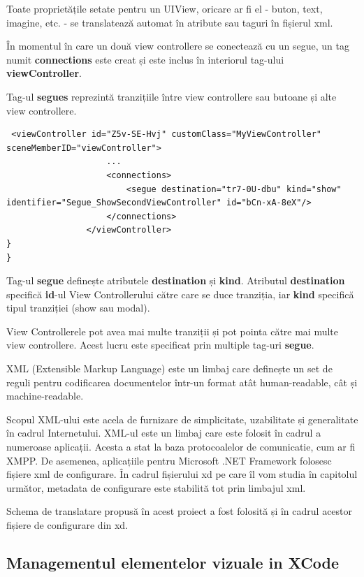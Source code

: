 Toate proprietățile setate pentru un UIView, oricare ar fi el - buton, text, imagine, etc. - se translatează automat în atribute sau taguri în fișierul xml.

În momentul în care un două view controllere se conectează cu un segue, un tag numit \textbf{connections} este creat și este inclus în interiorul tag-ului \textbf{viewController}.

Tag-ul \textbf{segues} reprezintă tranzițiile între view controllere sau butoane și alte view controllere.

\lstset{language=XML}\label{segueXML}
\begin{lstlisting}
 <viewController id="Z5v-SE-Hvj" customClass="MyViewController" sceneMemberID="viewController">
                    ...
                    <connections>
                        <segue destination="tr7-0U-dbu" kind="show" identifier="Segue_ShowSecondViewController" id="bCn-xA-8eX"/>
                    </connections>
                </viewController>
}
}
\end{lstlisting}

Tag-ul \textbf{segue} definește atributele \textbf{destination} și \textbf{kind}. Atributul \textbf{destination} specifică \textbf{id}-ul View Controllerului către care se duce tranziția, iar \textbf{kind} specifică tipul tranziției (show sau modal).

View Controllerele pot avea mai multe tranziții și pot pointa către mai multe view controllere. Acest lucru este specificat prin multiple tag-uri \textbf{segue}.


XML (Extensible Markup Language) este un limbaj care definește un set de reguli pentru codificarea documentelor într-un format atât human-readable, cât și machine-readable. 

Scopul XML-ului este acela de furnizare de simplicitate, uzabilitate și generalitate în cadrul Internetului. XML-ul este un limbaj care este folosit în cadrul a numeroase aplicații. Acesta a stat la baza protocoalelor de comunicatie, cum ar fi XMPP. De asemenea, aplicațiile pentru Microsoft .NET Framework folosesc fișiere xml de configurare. În cadrul fișierului xd pe care îl vom studia în capitolul următor, metadata de configurare este stabilită tot prin limbajul xml. 

Schema de translatare propusă în acest proiect a fost folosită și în cadrul acestor fișiere de configurare din xd.

\subsection{Managementul elementelor vizuale in XCode}


